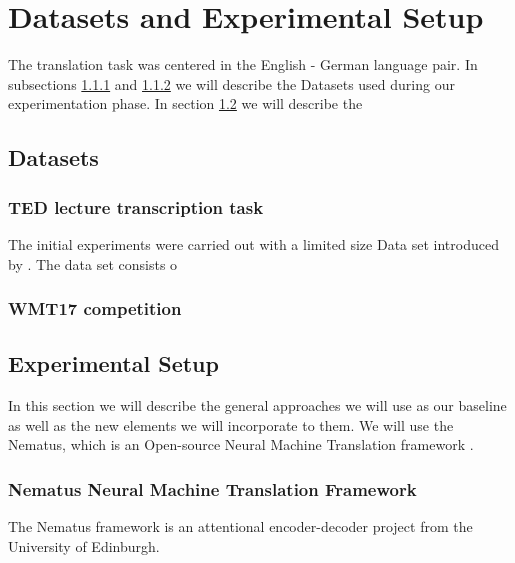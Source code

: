 
\chapter{Datasets and Experimental Setup}\label{ch:chapter3}

The translation task was centered in the English - German language pair. In subsections \ref{subsec:TEDdatasets} and \ref{subsec:datasets} we will describe the Datasets used during our experimentation phase. In section \ref{sec:experimentalsetup} we will describe the 

\section{Datasets}\label{sec:datasets}

\subsection{TED lecture transcription task}\label{subsec:TEDdatasets}
The initial experiments were carried out with a limited size Data set introduced by \citet*{TIEDEMANN12.463}. The data set consists o
\subsection{WMT17 competition}\label{subsec:datasets}
\citep{sennrich-EtAl:2017:WMT}
\section{Experimental Setup} \label{sec:experimentalsetup}

In this section we will describe the general approaches we will use as our baseline as well as the new elements we will incorporate to them. We will use the Nematus, which is an Open-source Neural Machine Translation framework \citep*{sennrich-EtAl:2017:EACLDemo}. 

\subsection{Nematus Neural Machine Translation Framework}
The Nematus framework is an attentional encoder-decoder project from the University of Edinburgh. 

